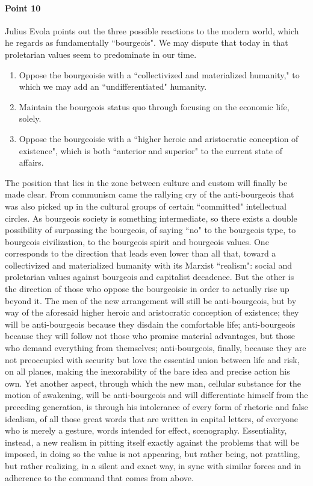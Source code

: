\paragraph{Point 10}
\begin{quotex}
Julius Evola points out the three possible reactions to the modern world, which he regards as fundamentally ``bourgeois". We may dispute that today in that proletarian values seem to predominate in our time.

\begin{enumerate}
\item
Oppose the bourgeoisie with a ``collectivized and materialized humanity," to which we may add an ``undifferentiated" humanity. 

\item
Maintain the bourgeois status quo through focusing on the economic life, solely. 
\item
Oppose the bourgeoisie with a ``higher heroic and aristocratic conception of existence", which is both ``anterior and superior" to the current state of affairs. 

\end{enumerate}
\end{quotex}
The position that lies in the zone between culture and custom will finally be made clear. From communism came the rallying cry of the anti-bourgeois that was also picked up in the cultural groups of certain ``committed" intellectual circles. As bourgeois society is something intermediate, so there exists a double possibility of surpassing the bourgeois, of saying ``no" to the bourgeois type, to bourgeois civilization, to the bourgeois spirit and bourgeois values. One corresponds to the direction that leads even lower than all that, toward a collectivized and materialized humanity with its Marxist ``realism": social and proletarian values against bourgeois and capitalist decadence. But the other is the direction of those who oppose the bourgeoisie in order to actually rise up beyond it. The men of the new arrangement will still be anti-bourgeois, but by way of the aforesaid higher heroic and aristocratic conception of existence; they will be anti-bourgeois because they disdain the comfortable life; anti-bourgeois because they will follow not those who promise material advantages, but those who demand everything from themselves; anti-bourgeois, finally, because they are not preoccupied with security but love the essential union between life and risk, on all planes, making the inexorability of the bare idea and precise action his own. Yet another aspect, through which the new man, cellular substance for the motion of awakening, will be anti-bourgeois and will differentiate himself from the preceding generation, is through his intolerance of every form of rhetoric and false idealism, of all those great words that are written in capital letters, of everyone who is merely a gesture, words intended for effect, scenography. Essentiality, instead, a new realism in pitting itself exactly against the problems that will be imposed, in doing so the value is not appearing, but rather being, not prattling, but rather realizing, in a silent and exact way, in sync with similar forces and in adherence to the command that comes from above.

